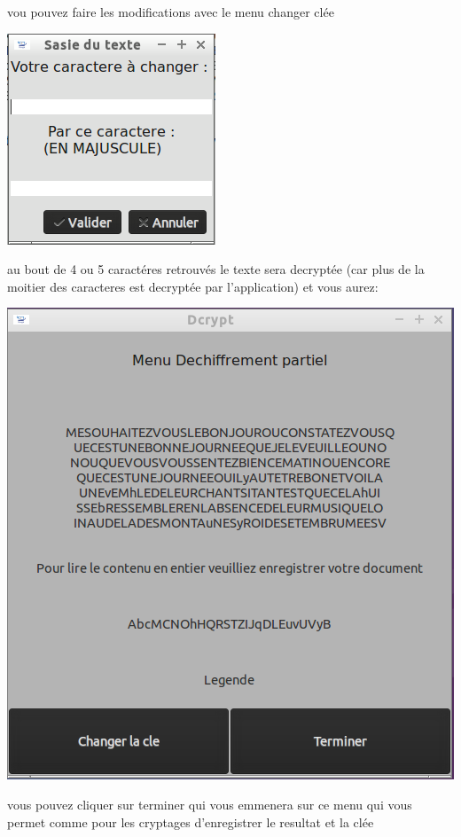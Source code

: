 \documentclass[a4]{article}
\begin{document}
			vou pouvez faire les modifications avec le menu changer clée 
			\begin{center}\includegraphics[scale=0.4]{23.png}\end{center}
			au bout de 4 ou 5 caractéres retrouvés le texte sera decryptée (car plus de la moitier 
			des caracteres est decryptée par l'application) et vous aurez:
			\begin{center}\includegraphics[scale=0.4]{11.png}\end{center}
			vous pouvez cliquer sur terminer qui vous emmenera sur ce menu qui vous permet comme pour 
			les cryptages d'enregistrer le resultat et la clée
\end{document}
